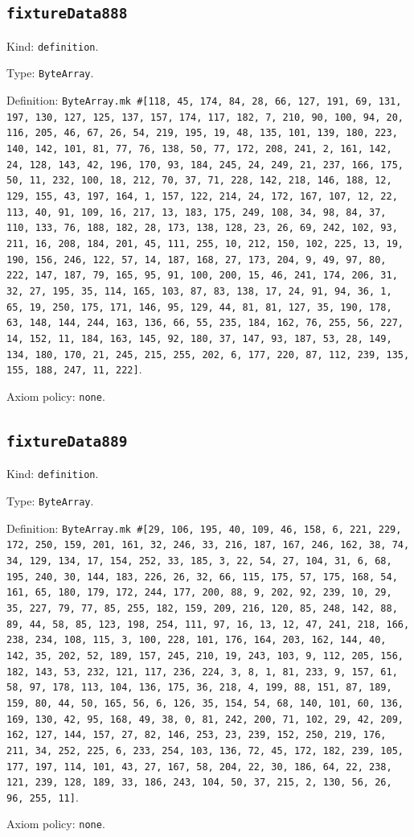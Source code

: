 \documentclass[11pt]{article}
\begin{document}
\subsection*{\texttt{fixtureData888}}
\noindent Kind: \texttt{definition}.\par
\noindent Type: \texttt{ByteArray}.\par
\noindent Definition: \texttt{ByteArray.mk \#[118, 45, 174, 84, 28, 66, 127, 191, 69, 131, 197, 130, 127, 125, 137, 157, 174, 117, 182, 7, 210, 90, 100, 94, 20, 116, 205, 46, 67, 26, 54, 219, 195, 19, 48, 135, 101, 139, 180, 223, 140, 142, 101, 81, 77, 76, 138, 50, 77, 172, 208, 241, 2, 161, 142, 24, 128, 143, 42, 196, 170, 93, 184, 245, 24, 249, 21, 237, 166, 175, 50, 11, 232, 100, 18, 212, 70, 37, 71, 228, 142, 218, 146, 188, 12, 129, 155, 43, 197, 164, 1, 157, 122, 214, 24, 172, 167, 107, 12, 22, 113, 40, 91, 109, 16, 217, 13, 183, 175, 249, 108, 34, 98, 84, 37, 110, 133, 76, 188, 182, 28, 173, 138, 128, 23, 26, 69, 242, 102, 93, 211, 16, 208, 184, 201, 45, 111, 255, 10, 212, 150, 102, 225, 13, 19, 190, 156, 246, 122, 57, 14, 187, 168, 27, 173, 204, 9, 49, 97, 80, 222, 147, 187, 79, 165, 95, 91, 100, 200, 15, 46, 241, 174, 206, 31, 32, 27, 195, 35, 114, 165, 103, 87, 83, 138, 17, 24, 91, 94, 36, 1, 65, 19, 250, 175, 171, 146, 95, 129, 44, 81, 81, 127, 35, 190, 178, 63, 148, 144, 244, 163, 136, 66, 55, 235, 184, 162, 76, 255, 56, 227, 14, 152, 11, 184, 163, 145, 92, 180, 37, 147, 93, 187, 53, 28, 149, 134, 180, 170, 21, 245, 215, 255, 202, 6, 177, 220, 87, 112, 239, 135, 155, 188, 247, 11, 222]}.\par
\noindent Axiom policy: \texttt{none}.\par
\subsection*{\texttt{fixtureData889}}
\noindent Kind: \texttt{definition}.\par
\noindent Type: \texttt{ByteArray}.\par
\noindent Definition: \texttt{ByteArray.mk \#[29, 106, 195, 40, 109, 46, 158, 6, 221, 229, 172, 250, 159, 201, 161, 32, 246, 33, 216, 187, 167, 246, 162, 38, 74, 34, 129, 134, 17, 154, 252, 33, 185, 3, 22, 54, 27, 104, 31, 6, 68, 195, 240, 30, 144, 183, 226, 26, 32, 66, 115, 175, 57, 175, 168, 54, 161, 65, 180, 179, 172, 244, 177, 200, 88, 9, 202, 92, 239, 10, 29, 35, 227, 79, 77, 85, 255, 182, 159, 209, 216, 120, 85, 248, 142, 88, 89, 44, 58, 85, 123, 198, 254, 111, 97, 16, 13, 12, 47, 241, 218, 166, 238, 234, 108, 115, 3, 100, 228, 101, 176, 164, 203, 162, 144, 40, 142, 35, 202, 52, 189, 157, 245, 210, 19, 243, 103, 9, 112, 205, 156, 182, 143, 53, 232, 121, 117, 236, 224, 3, 8, 1, 81, 233, 9, 157, 61, 58, 97, 178, 113, 104, 136, 175, 36, 218, 4, 199, 88, 151, 87, 189, 159, 80, 44, 50, 165, 56, 6, 126, 35, 154, 54, 68, 140, 101, 60, 136, 169, 130, 42, 95, 168, 49, 38, 0, 81, 242, 200, 71, 102, 29, 42, 209, 162, 127, 144, 157, 27, 82, 146, 253, 23, 239, 152, 250, 219, 176, 211, 34, 252, 225, 6, 233, 254, 103, 136, 72, 45, 172, 182, 239, 105, 177, 197, 114, 101, 43, 27, 167, 58, 204, 22, 30, 186, 64, 22, 238, 121, 239, 128, 189, 33, 186, 243, 104, 50, 37, 215, 2, 130, 56, 26, 96, 255, 11]}.\par
\noindent Axiom policy: \texttt{none}.\par
\end{document}
